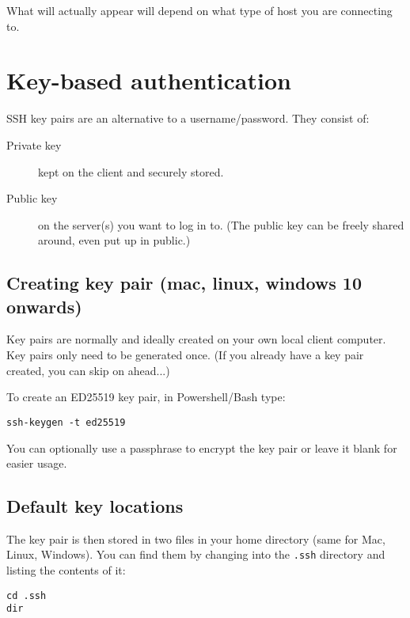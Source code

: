 \documentclass[slides]{pgnotes}
\begin{document}
What will actually appear will depend on what type of host you are connecting to.


\section{Key-based authentication}
\label{key-based-authentication}

SSH key pairs are an alternative to a username/password.
They consist of:

\begin{description}
\item[Private key]
kept on the client and securely stored.
\item[Public key]
on the server(s) you want to log in to. (The public key can be freely
shared around, even put up in public.)
\end{description}



\subsection{Creating key pair (mac, linux, windows 10 onwards)}
\label{sec:creating-key-pair-unix}

Key pairs are normally and ideally created on your own local client computer.
Key pairs only need to be generated once.
(If you already have a key pair created, you can skip on ahead...)

To create an ED25519 key pair, in Powershell/Bash type:

\begin{verbatim}
ssh-keygen -t ed25519
\end{verbatim}

You can optionally use a passphrase to encrypt the key pair or leave it blank for easier usage.

\subsection{Default key locations}

The key pair is then stored in two files in your home directory (same for Mac, Linux, Windows).
You can find them by changing into the \texttt{.ssh} directory and listing the contents of it:

\begin{verbatim}
cd .ssh
dir
\end{verbatim}
\end{document}
